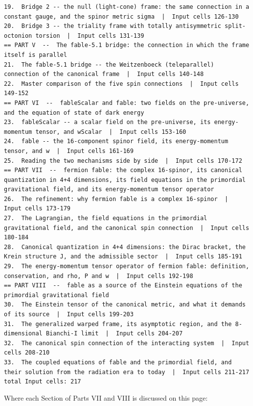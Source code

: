 \begin{Verbatim}
19.  Bridge 2 -- the null (light-cone) frame: the same connection in a constant gauge, and the spinor metric sigma  |  Input cells 126-130
20.  Bridge 3 -- the triality frame with totally antisymmetric split-octonion torsion  |  Input cells 131-139
== PART V  --  The fable-5.1 bridge: the connection in which the frame itself is parallel
21.  The fable-5.1 bridge -- the Weitzenboeck (teleparallel) connection of the canonical frame  |  Input cells 140-148
22.  Master comparison of the five spin connections  |  Input cells 149-152
== PART VI  --  fableScalar and fable: two fields on the pre-universe, and the equation of state of dark energy
23.  fableScalar -- a scalar field on the pre-universe, its energy-momentum tensor, and wScalar  |  Input cells 153-160
24.  fable -- the 16-component spinor field, its energy-momentum tensor, and w  |  Input cells 161-169
25.  Reading the two mechanisms side by side  |  Input cells 170-172
== PART VII  --  fermion fable: the complex 16-spinor, its canonical quantization in 4+4 dimensions, its field equations in the primordial gravitational field, and its energy-momentum tensor operator
26.  The refinement: why fermion fable is a complex 16-spinor  |  Input cells 173-179
27.  The Lagrangian, the field equations in the primordial gravitational field, and the canonical spin connection  |  Input cells 180-184
28.  Canonical quantization in 4+4 dimensions: the Dirac bracket, the Krein structure J, and the admissible sector  |  Input cells 185-191
29.  The energy-momentum tensor operator of fermion fable: definition, conservation, and rho, P and w  |  Input cells 192-198
== PART VIII  --  fable as a source of the Einstein equations of the primordial gravitational field
30.  The Einstein tensor of the canonical metric, and what it demands of its source  |  Input cells 199-203
31.  The generalized warped frame, its asymptotic region, and the 8-dimensional Bianchi-I limit  |  Input cells 204-207
32.  The canonical spin connection of the interacting system  |  Input cells 208-210
33.  The coupled equations of fable and the primordial field, and their solution from the radiation era to today  |  Input cells 211-217
total Input cells: 217
\end{Verbatim}

Where each Section of Parts VII and VIII is discussed on this page:

